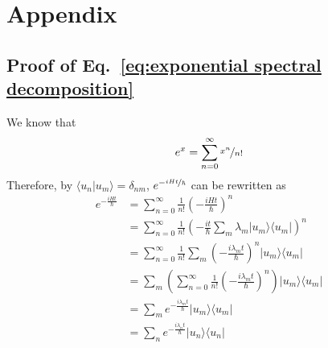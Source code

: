 \documentclass[aps]{revtex4-2}
\begin{document}
\section{Appendix}
\subsection{Proof of Eq.~\ref{eq:exponential spectral decomposition}}
We know that
\begin{equation}
    \label{eq:expansion}
    e^x=\sum_{n=0}^\infty\nicefrac{x^n}{n!}
\end{equation}
Therefore, by $\langle u_n|u_m\rangle=\delta_{nm}$, $e^{-\nicefrac{iHt}{\hbar}}$ can be rewritten as
\begin{align}
    e^{-\frac{i H t}{\hbar}} &= \sum_{n=0}^{\infty} \frac{1}{n!} \left(-\frac{i H t}{\hbar}\right)^n\nonumber\\
    &= \sum_{n=0}^{\infty} \frac{1}{n!} \left(-\frac{i t}{\hbar} \sum_m \lambda_m |u_m\rangle \langle u_m| \right)^n\nonumber\\
    &= \sum_{n=0}^{\infty} \frac{1}{n!} \sum_m \left(-\frac{i \lambda_m t}{\hbar}\right)^n |u_m\rangle \langle u_m|\nonumber\\
    &= \sum_m \left( \sum_{n=0}^{\infty} \frac{1}{n!} \left(-\frac{i \lambda_m t}{\hbar}\right)^n \right) |u_m\rangle \langle u_m|\nonumber\\
    &= \sum_m e^{-\frac{i \lambda_m t}{\hbar}} |u_m\rangle \langle u_m|\nonumber\\
    &= \sum_n e^{-\frac{i \lambda_n t}{\hbar}} |u_n\rangle \langle u_n|
\end{align}
\end{document}
